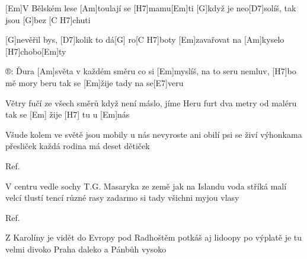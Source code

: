 
[Em]V Bělském lese [Am]toulají se [H7]mamu[Em]ti
[G]když je neo[D7]solíš, tak jsou [G]bez [C H7]chuti

[G]nevěřil bys, [D7]kolik to dá[G] ro[C H7]boty	
[Em]zavařovat na [Am]kyselo [H7]chobo[Em]ty

®:	Ďura [Am]světa v každém směru	
co si [Em]myslíš, na to seru	
nemluv, [H7]bo mě mory beru	
tak se [Em]\null žije tady na se[E7]veru

Větry fučí ze všech směrů
když není máslo, jíme Heru
furt dva metry od maléru	
tak se [Em] \null žije [H7] tu u [Em]nás

\columnbreak
\medskip
Všude kolem ve světě jsou mobily
u nás nevyroste ani obilí
psi se živí výhonkama přesliček
každá rodina má deset dětiček

Ref.

V centru vedle sochy T.G. Masaryka
ze země jak na Islandu voda stříká
malí velcí tlustí tencí různé rasy
zadarmo si tady všichni myjou vlasy

Ref.

Z Karolíny je vidět do Evropy
pod Radhoštěm potkáš aj lidoopy
po výplatě je tu velmi divoko
Praha daleko a Pánbůh vysoko